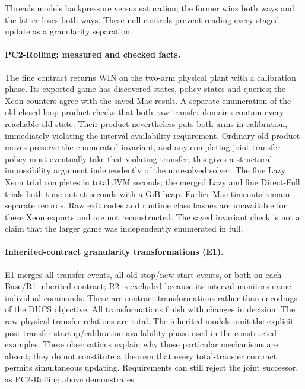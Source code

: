 \documentclass[11pt]{article}
\begin{document}
Threads models backpressure versus saturation; the former wins both ways and the latter loses both ways. These null controls prevent reading every staged update as a granularity separation.

\paragraph{PC2-Rolling: measured and checked facts.}
The fine contract returns WIN on the two-arm physical plant with a calibration phase. Its exported game has \VThreeESixPCTwoFineStates{} discovered states, \VThreeESixPCTwoCertificateStates{} policy states and \VThreeESixPCTwoQueries{} queries; the Xeon counters agree with the saved Mac result. A separate enumeration of the old closed-loop product checks that both raw transfer domains contain every reachable old state. Their product nevertheless puts both arms in calibration, immediately violating the interval availability requirement. Ordinary old-product moves preserve the enumerated invariant, and any completing joint-transfer policy must eventually take that violating transfer; this gives a structural impossibility argument independently of the unresolved solver. The fine Lazy Xeon trial completes in \VThreeESixPCTwoXeonJVMSec{} total JVM seconds; the merged Lazy and fine Direct-Full trials both time out at \VThreeESixPCTwoCap{} seconds with a \VThreeESixPCTwoHeap{} GiB heap. Earlier Mac timeouts remain separate records. Raw exit codes and runtime class hashes are unavailable for these Xeon exports and are not reconstructed. The saved invariant check is not a claim that the larger game was independently enumerated in full.

\paragraph{Inherited-contract granularity transformations (E1).}
E1 merges all transfer events, all old-stop/new-start events, or both on each Base/R1 inherited contract; R2 is excluded because its interval monitors name individual commands. These are contract transformations rather than encodings of the DUCS objective. All \VThreeEOneTrials{} transformations finish with \VThreeEOneChanged{} changes in decision. The raw physical transfer relations are total. The inherited models omit the explicit post-transfer startup/calibration availability phase used in the constructed examples. These observations explain why those particular mechanisms are absent; they do not constitute a theorem that every total-transfer contract permits simultaneous updating. Requirements can still reject the joint successor, as PC2-Rolling above demonstrates.
\end{document}
